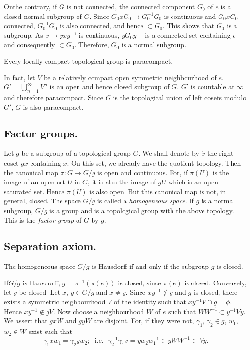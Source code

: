 On\pageoriginale the contrary, if $G$ is not connected, the connected
component $G_0$ of $e$ is a closed normal subgroup of $G$. Since $G_0
x G_0 \to 
G^{-1}_0 G_0$ is continuous and $G_0 x G_0$ connected, $G^{-1}_0 G_0$
is also connected, and hence $\subset G_0$. This shows that $G_{0}$ is
a subgroup. As $x \to y x  y^{-1}$ is continuous, $y G_0 y^{-1}$
is a connected set containing 
$e$ and consequently $\subset G_0$. Therefore, $G_0$ is a normal
subgroup. 

\begin{proposition}\label{chap1-prop3}%
Every locally compact topological group is paracompact.
\end{proposition}

In fact, let $V$ be a relatively compact open symmetric neighbourhood
of $e$. $G'=\bigcup\limits^{\infty}_{n=1} V^n$ is an open and
hence closed subgroup of $G$. $G'$ is countable at $\infty$ and
therefore paracompact. Since $G$ is the topological union of left
cosets modulo $G'$, $G$ is also paracompact. 

\subsection{Factor groups.}\label{chap1-sec1.3}%

Let $g$ be a subgroup of a topological group $G$. We shall denote by
$\dot{x}$ the right coset $gx$ containing $x$. On this set, we already
have the quotient topology. Then the canonical map $\pi : G
\to G/g$ is open and continuous. For, if $\pi(U)$ is the image
of an open set $U$ in $G$, it is also the image of $gU$ which is an
open saturated set. Hence $\pi(U)$ is also open. But this canonical
map is not, in general, closed. The space $G/g$ is called a
\textit{homogeneous space}. If $g$ is a normal subgroup, $G/g$ is a
group and is a topological group with the above topology. This is the
\textit{factor group} of $G$ by $g$. 

\subsection{Separation axiom.}\label{chap1-sec1.4}%

\begin{thm}\label{chap1-thm1}%
The homogeneous space $G/g$ is Hausdorff if and only if the subgroup
$g$ is closed. 
\end{thm}

If\pageoriginale $G/g$ is Hausdorff, $g= \pi^{-1}(\pi (e))$ is closed, since
$\pi(e)$ is closed. Conversely, let $g$ be closed. Let $x$, $y \in G/g$
and $x \neq y$. Since $xy^{-1}\notin g$ and $g$ is closed, there
exists a symmetric neighbourhood $V$ of the identity such that $x
y^{-1} V \cap g= \phi$.  Hence $x y^{-1}\notin g V$. Now choose a
neighbourhood $W$ of $e$ such that $WW^{-1} \subset y^{-1} Vy$. We
assert that $g x W$ and $g y W$ are disjoint. For, if they were
not, $\gamma_1$, $\gamma_2 \in g$, $w_1$, $w_2 \in W$ exist such that 
$$ 
\gamma_1 x w_1 = \gamma_2 y w_2; \text{~ i.e.~  } \gamma^{-1}_2
\gamma_1 x= y w_2 w^{-1}_1 \in y W W^{-1} \subset V y. 
$$

